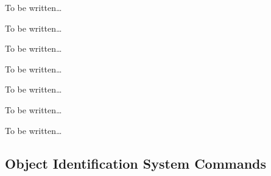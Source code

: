 \begin{command}{\pgfsys@animation@color@cmy{}}
  To be written\dots
\end{command}

\begin{command}{\pgfsys@animation@color@gray{}}
  To be written\dots
\end{command}

\begin{command}{\pgfsys@animation@path{}}
  To be written\dots
\end{command}

\begin{command}{\pgfsys@animation@translate{}}
  To be written\dots
\end{command}

\begin{command}{\pgfsys@animation@scale{}}
  To be written\dots
\end{command}

\begin{command}{\pgfsys@animation@rotate{}}
  To be written\dots
\end{command}

\begin{command}{\pgfsys@animation@viewbox{}}
  To be written\dots
\end{command}





\subsection{Object Identification System Commands}
\label{section-sys-id}

